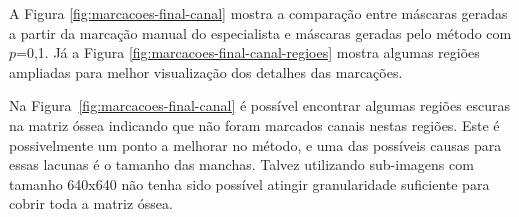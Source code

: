 

A Figura \ref{fig:marcacoes-final-canal} mostra a comparação entre máscaras geradas a partir da marcação manual do especialista e máscaras geradas pelo método com $p$=0,1. Já a Figura \ref{fig:marcacoes-final-canal-regioes} mostra algumas regiões ampliadas para melhor visualização dos detalhes das marcações.

Na Figura~\ref{fig:marcacoes-final-canal} é possível encontrar algumas regiões escuras na matriz óssea indicando que não foram marcados canais nestas regiões. Este é possivelmente um ponto a melhorar no método, e uma das possíveis causas para essas lacunas é o tamanho das manchas. Talvez utilizando sub-imagens com tamanho 640x640 não tenha sido possível atingir granularidade suficiente para cobrir toda a matriz óssea.

